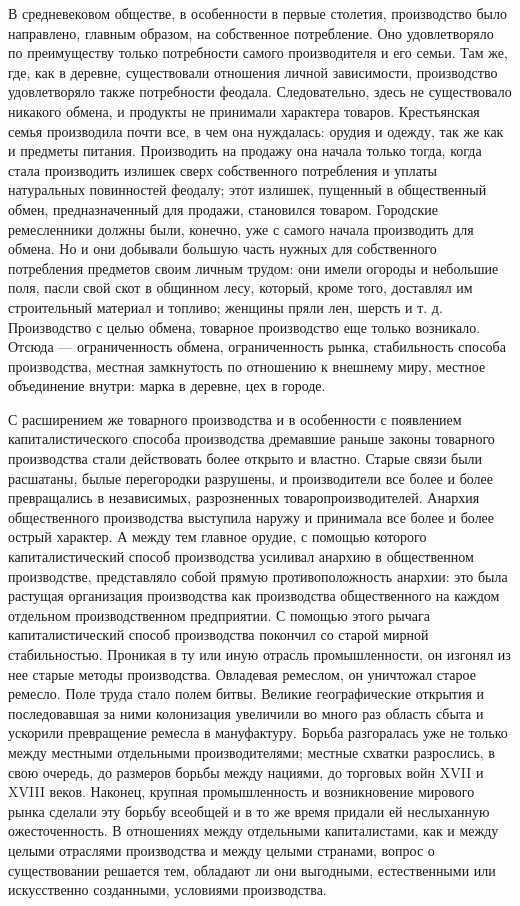 \documentclass[12pt]{article}
\newcommand{\parnum}{(\arabic{parcount})}
\newcounter{parcount}
\newenvironment{parnumbers}{%
  \par%
  \everypar{\noindent \stepcounter{parcount}\marginpar[]{\parnum}}%
}{}
\begin{document}
\begin{parnumbers}
    В средневековом обществе, в особенности в первые столетия, производство было направлено, главным образом, на собственное потребление. Оно удовлетворяло по преимуществу только потребности самого производителя и его семьи. Там же, где, как в деревне, существовали отношения личной зависимости, производство удовлетворяло также потребности феодала. Следовательно, здесь не существовало никакого обмена, и продукты не принимали характера товаров. Крестьянская семья производила почти все, в чем она нуждалась: орудия и одежду, так же как и предметы питания. Производить на продажу она начала только тогда, когда стала производить излишек сверх собственного потребления и уплаты натуральных повинностей феодалу; этот излишек, пущенный в общественный обмен, предназначенный для продажи, становился товаром. Городские ремесленники должны были, конечно, уже с самого начала производить для обмена. Но и они добывали большую часть нужных для собственного потребления предметов своим личным трудом: они имели огороды и небольшие поля, пасли свой скот в общинном лесу, который, кроме того, доставлял им строительный материал и топливо; женщины пряли лен, шерсть и т. д. Производство с целью обмена, товарное производство еще только возникало. Отсюда — ограниченность обмена, ограниченность рынка, стабильность способа производства, местная замкнутость по отношению к внешнему миру, местное объединение внутри: марка в деревне, цех в городе.

    С расширением же товарного производства и в особенности с появлением капиталистического способа производства дремавшие раньше законы товарного производства стали действовать более открыто и властно. Старые связи были расшатаны, былые перегородки разрушены, и производители все более и более превращались в независимых, разрозненных товаропроизводителей. Анархия общественного производства выступила наружу и принимала все более и более острый характер. А между тем главное орудие, с помощью которого капиталистический способ производства усиливал анархию в общественном производстве, представляло собой прямую противоположность анархии: это была растущая организация производства как производства общественного на каждом отдельном производственном предприятии. С помощью этого рычага капиталистический способ производства покончил со старой мирной стабильностью. Проникая в ту или иную отрасль промышленности, он изгонял из нее старые методы производства. Овладевая ремеслом, он уничтожал старое ремесло. Поле труда стало полем битвы. Великие географические открытия и последовавшая за ними колонизация увеличили во много раз область сбыта и ускорили превращение ремесла в мануфактуру. Борьба разгоралась уже не только между местными отдельными производителями; местные схватки разрослись, в свою очередь, до размеров борьбы между нациями, до торговых войн XVII и XVIII веков. Наконец, крупная промышленность и возникновение мирового рынка сделали эту борьбу всеобщей и в то же время придали ей неслыханную ожесточенность. В отношениях между отдельными капиталистами, как и между целыми отраслями производства и между целыми странами, вопрос о существовании решается тем, обладают ли они выгодными, естественными или искусственно созданными, условиями производства.


\end{parnumbers}
\end{document}

